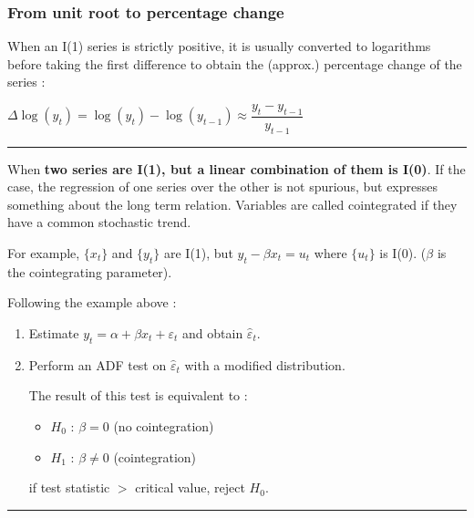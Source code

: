 \begin{f}
\subsubsection*{From unit root to percentage change}

When an I(1) series is strictly positive, it is usually converted to logarithms before taking the first difference to obtain the (approx.) percentage change of the series :

\begin{center}
	\(\Delta \log(y_{t}) = \log(y_{t}) - \log(y_{t - 1}) \approx \dfrac{y_t - y_{t - 1}} {y_{t - 1}}\)
\end{center}

		\end{f}  \hrule

  \begin{f}[Cointegration]

When \textbf{two series are I(1), but a linear combination of them is I(0)}. If the case, the regression of one series over the other is not spurious, but expresses something about the long term relation. Variables are called cointegrated if they have a common stochastic trend.

For example, \(\lbrace x_{t} \rbrace\) and \(\lbrace y_{t} \rbrace\) are I(1), but \(y_{t} - \beta x_{t} = u_{t}\) where \(\lbrace u_{t} \rbrace\) is I(0). (\(\beta\) is the cointegrating parameter).

\end{f}  

\begin{f}

Following the example above :

\begin{enumerate}[leftmargin=*]
	\item Estimate \(y_{t} = \alpha + \beta x_{t} + \varepsilon_{t}\) and obtain \(\hat{\varepsilon}_{t}\).
	\item Perform an ADF test on \(\hat{\varepsilon}_{t}\) with a modified distribution.
	
	The result of this test is equivalent to :
	
	\begin{itemize}[leftmargin=*]
		\item \(H_{0}\) : \(\beta = 0\) (no cointegration)
		\item \(H_{1}\) : \(\beta \neq 0\) (cointegration)
	\end{itemize}
	
	if test statistic \(>\) critical value, reject \(H_0\).
\end{enumerate}

\end{f}  \hrule

